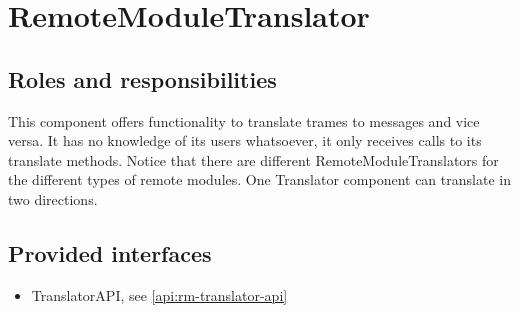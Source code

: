 \section{RemoteModuleTranslator}
\label{element:rm-translator}

\subsection{Roles and responsibilities}

\npar This component offers functionality to translate trames to messages and
vice versa. It has no knowledge of its users whatsoever, it only receives calls
to its translate methods. Notice that there are different
RemoteModuleTranslators for the different types of remote modules. One
Translator component can translate in two directions.

\subsection{Provided interfaces}

\begin{itemize}
  \item TranslatorAPI, see \ref{api:rm-translator-api}
\end{itemize}